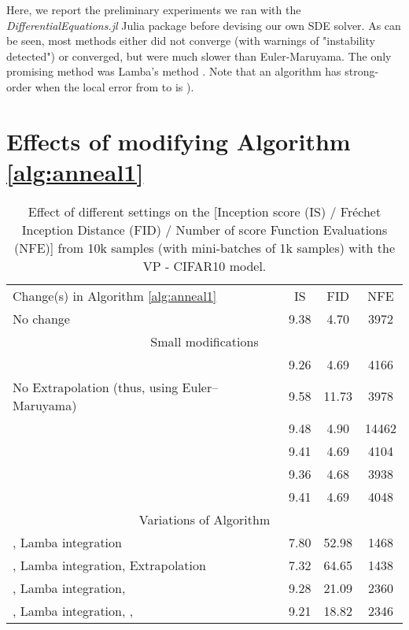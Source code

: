 \documentclass{article}
\begin{document}
Here, we report the preliminary experiments we ran with the {\em DifferentialEquations.jl} Julia package \citep{DifferentialEquations.jl-2017} before devising our own SDE solver. As can be seen, most methods either did not converge (with warnings of "instability detected") or converged, but were much slower than Euler-Maruyama. The only promising method was Lamba's method \citep{lamba2003adaptive}. Note that an algorithm has strong-order  when the local error from  to  is ).

\section{Effects of modifying Algorithm \ref{alg:anneal1}}\label{sec:modif}

\begin{table}[!ht]
	\caption{Effect of different settings on the [Inception score (IS) / Fréchet Inception Distance (FID) / Number of score Function Evaluations (NFE)] from 10k samples (with mini-batches of 1k samples) with the VP - CIFAR10 model.}
	\label{tab:table2a}
	\centering
	\begin{tabular}{lccc}
		\toprule
		Change(s) in Algorithm \ref{alg:anneal1} & IS & FID & NFE \\
		\cmidrule(){1-4}
	    No change  & 9.38 & 4.70 & 3972 \\
	    \cmidrule(){1-4}
	    \multicolumn{4}{c}{Small modifications} \\
	    \cmidrule(){1-4}
	    & 9.26 & 4.69 & 4166 \\
	    No Extrapolation (thus, using Euler–Maruyama) & 9.58 & 11.73 & 3978 \\
	     & 9.48 & 4.90 & 14462 \\
	     & 9.41 & 4.69 & 4104 \\
	     & 9.36 & 4.68 & 3938 \\
	      & 9.41 & 4.69 & 4048 \\
	    \cmidrule(){1-4}
	    \multicolumn{4}{c}{Variations of \citet{lamba2003adaptive} Algorithm}\\
	    \cmidrule(){1-4}
	    , Lamba integration & 7.80 & 52.98 & 1468 \\
	    , Lamba integration, Extrapolation & 7.32 & 64.65 & 1438 \\
	   , Lamba integration,  & 9.28 & 21.09 & 2360 \\
	   , Lamba integration, ,  & 9.21 & 18.82 & 2346 \\
		\bottomrule
	\end{tabular}
\end{table}
\end{document}
